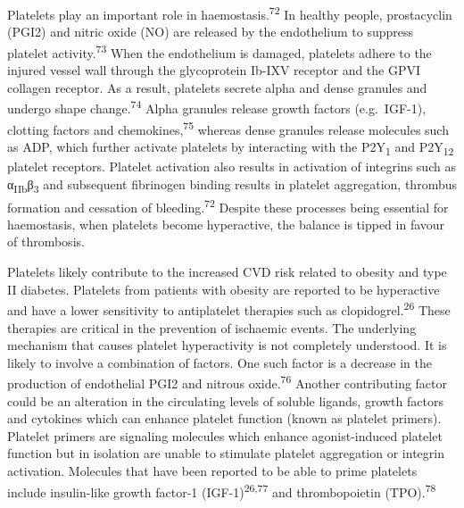 \documentclass[11pt,twoside]{bristolthesis}
\begin{document}
Platelets play an important role in haemostasis.\textsuperscript{72} In healthy people, prostacyclin (PGI2) and nitric oxide (NO) are released by the endothelium to suppress platelet activity.\textsuperscript{73} When the endothelium is damaged, platelets adhere to the injured vessel wall through the glycoprotein Ib-IXV receptor and the GPVI collagen receptor. As a result, platelets secrete alpha and dense granules and undergo shape change.\textsuperscript{74} Alpha granules release growth factors (e.g.~IGF-1), clotting factors and chemokines,\textsuperscript{75} whereas dense granules release molecules such as ADP, which further activate platelets by interacting with the P2Y\textsubscript{1} and P2Y\textsubscript{12} platelet receptors. Platelet activation also results in activation of integrins such as α\textsubscript{IIb}β\textsubscript{3} and subsequent fibrinogen binding results in platelet aggregation, thrombus formation and cessation of bleeding.\textsuperscript{72} Despite these processes being essential for haemostasis, when platelets become hyperactive, the balance is tipped in favour of thrombosis.

Platelets likely contribute to the increased CVD risk related to obesity and type II diabetes. Platelets from patients with obesity are reported to be hyperactive and have a lower sensitivity to antiplatelet therapies such as clopidogrel.\textsuperscript{26} These therapies are critical in the prevention of ischaemic events. The underlying mechanism that causes platelet hyperactivity is not completely understood. It is likely to involve a combination of factors. One such factor is a decrease in the production of endothelial PGI2 and nitrous oxide.\textsuperscript{76} Another contributing factor could be an alteration in the circulating levels of soluble ligands, growth factors and cytokines which can enhance platelet function (known as platelet primers). Platelet primers are signaling molecules which enhance agonist-induced platelet function but in isolation are unable to stimulate platelet aggregation or integrin activation. Molecules that have been reported to be able to prime platelets include insulin-like growth factor-1 (IGF-1)\textsuperscript{26,77} and thrombopoietin (TPO).\textsuperscript{78}
\end{document}
